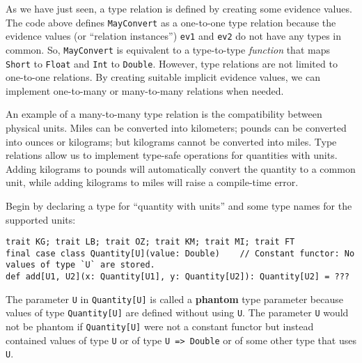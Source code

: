 As we have just seen, a type relation is defined by creating some
evidence values. The code above defines \lstinline!MayConvert! as
a one-to-one type relation because the evidence values (or \textsf{``}relation
instances\textsf{''}) \lstinline!ev1! and \lstinline!ev2! do not have any
types in common. So, \lstinline!MayConvert! is equivalent to a type-to-type
\emph{function} that maps \lstinline!Short! to \lstinline!Float!
and \lstinline!Int! to \lstinline!Double!. However, type relations
are not limited to one-to-one relations. By creating suitable implicit
evidence values, we can implement one-to-many or many-to-many relations
when needed. 

An example of a many-to-many type
relation is the compatibility between physical units. Miles can be
converted into kilometers; pounds can be converted into ounces or
kilograms; but kilograms cannot be converted into miles. Type relations
allow us to implement type-safe operations for quantities with units.
Adding kilograms to pounds will automatically convert the quantity
to a common unit, while adding kilograms to miles will raise a compile-time
error.

Begin by declaring a type for \textsf{``}quantity with units\textsf{''} and some type
names for the supported units:
\begin{lstlisting}
trait KG; trait LB; trait OZ; trait KM; trait MI; trait FT
final case class Quantity[U](value: Double)    // Constant functor: No values of type `U` are stored.
def add[U1, U2](x: Quantity[U1], y: Quantity[U2]): Quantity[U2] = ???
\end{lstlisting}
The parameter \lstinline!U! in \lstinline!Quantity[U]! is called
a \textbf{phantom} type parameter because
values of type \lstinline!Quantity[U]! are defined without using
\lstinline!U!. The parameter \lstinline!U! would not be phantom
if \lstinline!Quantity[U]! were not a constant functor
but instead contained values  of type \lstinline!U! or of type \lstinline!U => Double!
or of some other type that uses \lstinline!U!. 

